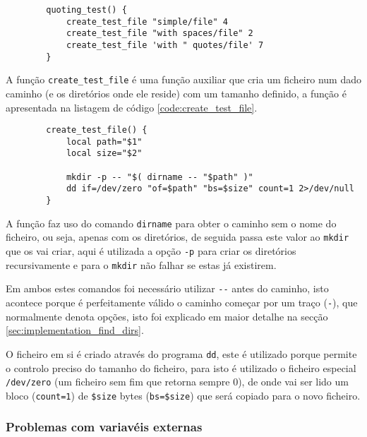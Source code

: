\begin{listing}[H]
	\centering
	\begin{verbatim}
		quoting_test() {
			create_test_file "simple/file" 4
			create_test_file "with spaces/file" 2
			create_test_file 'with " quotes/file' 7
		}
	\end{verbatim}
	\cprotect\caption{Exemplo da definição de um teste do \Verb|spacecheck.sh|.}
	\label{code:test_definition}
\end{listing}

A função \Verb|create_test_file| é uma função auxiliar que cria um ficheiro num
dado caminho (e os diretórios onde ele reside) com um tamanho definido, a função
é apresentada na listagem de código \ref{code:create_test_file}.

\begin{listing}[H]
	\centering
	\begin{verbatim}
		create_test_file() {
			local path="$1"
			local size="$2"

			mkdir -p -- "$( dirname -- "$path" )"
			dd if=/dev/zero "of=$path" "bs=$size" count=1 2>/dev/null
		}
	\end{verbatim}
	\cprotect\caption{Definição da função \Verb|create_test_file|.}
	\label{code:create_test_file}
\end{listing}

A função faz uso do comando \Verb|dirname| para obter o caminho sem o nome do
ficheiro, ou seja, apenas com os diretórios, de seguida passa este valor ao
\Verb|mkdir| que os vai criar, aqui é utilizada a opção \Verb|-p| para criar os
diretórios recursivamente e para o \Verb|mkdir| não falhar se estas já existirem.

Em ambos estes comandos foi necessário utilizar \Verb|--| antes do caminho, isto
acontece porque é perfeitamente válido o caminho começar por um traço
(\Verb|-|), que normalmente denota opções, isto foi explicado em maior detalhe
na secção \ref{sec:implementation_find_dirs}.

O ficheiro em si é criado através do programa \Verb|dd|, este é utilizado porque
permite o controlo preciso do tamanho do ficheiro, para isto é utilizado o
ficheiro especial \Verb|/dev/zero| (um ficheiro sem fim que retorna sempre 0),
de onde vai ser lido um bloco (\Verb|count=1|) de \Verb|$size| bytes
(\Verb|bs=$size|) que será copiado para o novo ficheiro.

\subsubsection{Problemas com variavéis externas}


